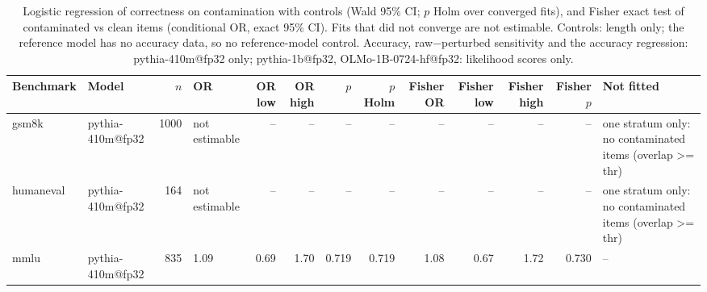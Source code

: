 \begin{table}[t]
\centering
\caption{Logistic regression of correctness on contamination with controls (Wald 95\% CI; $p$ Holm over converged fits), and Fisher exact test of contaminated vs clean items (conditional OR, exact 95\% CI). Fits that did not converge are not estimable. Controls: length only; the reference model has no accuracy data, so no reference-model control. Accuracy, raw$-$perturbed sensitivity and the accuracy regression: pythia-410m@fp32 only; pythia-1b@fp32, OLMo-1B-0724-hf@fp32: likelihood scores only. }
\label{tab:regression}
\begin{tabular}{llrlrrrrrrrrl}
\toprule
Benchmark & Model & $n$ & OR & OR low & OR high & $p$ & $p$ Holm & Fisher OR & Fisher low & Fisher high & Fisher $p$ & Not fitted \\
\midrule
gsm8k & pythia-410m@fp32 & 1000 & not estimable & -- & -- & -- & -- & -- & -- & -- & -- & one stratum only: no contaminated items (overlap >= thr) \\
\midrule
humaneval & pythia-410m@fp32 & 164 & not estimable & -- & -- & -- & -- & -- & -- & -- & -- & one stratum only: no contaminated items (overlap >= thr) \\
\midrule
mmlu & pythia-410m@fp32 & 835 & 1.09 & 0.69 & 1.70 & 0.719 & 0.719 & 1.08 & 0.67 & 1.72 & 0.730 & -- \\
\bottomrule
\end{tabular}
\end{table}
